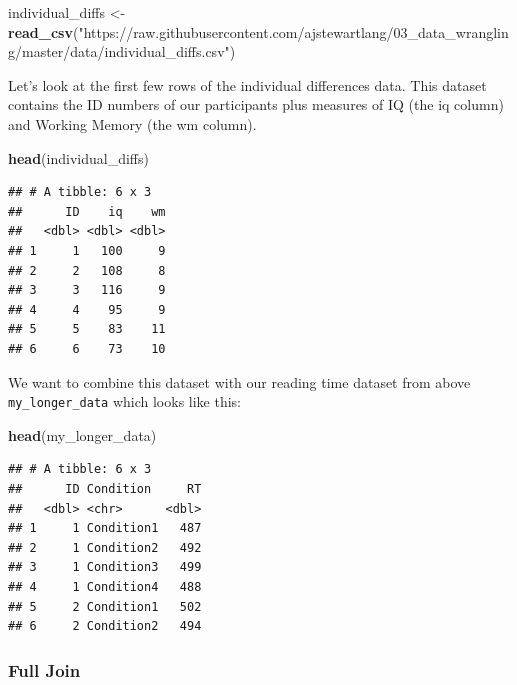 \documentclass[
]{book}
\newenvironment{Shaded}{\begin{snugshade}}{\end{snugshade}}
\newcommand{\FunctionTok}[1]{\textcolor[rgb]{0.13,0.29,0.53}{\textbf{#1}}}
\newcommand{\NormalTok}[1]{#1}
\newcommand{\OtherTok}[1]{\textcolor[rgb]{0.56,0.35,0.01}{#1}}
\newcommand{\StringTok}[1]{\textcolor[rgb]{0.31,0.60,0.02}{#1}}
\begin{document}
\begin{Shaded}
\begin{Highlighting}[]
\NormalTok{individual\_diffs }\OtherTok{\textless{}{-}} \FunctionTok{read\_csv}\NormalTok{(}\StringTok{"https://raw.githubusercontent.com/ajstewartlang/03\_data\_wrangling/master/data/individual\_diffs.csv"}\NormalTok{)}
\end{Highlighting}
\end{Shaded}

Let's look at the first few rows of the individual differences data. This dataset contains the ID numbers of our participants plus measures of IQ (the iq column) and Working Memory (the wm column).

\begin{Shaded}
\begin{Highlighting}[]
\FunctionTok{head}\NormalTok{(individual\_diffs)}
\end{Highlighting}
\end{Shaded}

\begin{verbatim}
## # A tibble: 6 x 3
##      ID    iq    wm
##   <dbl> <dbl> <dbl>
## 1     1   100     9
## 2     2   108     8
## 3     3   116     9
## 4     4    95     9
## 5     5    83    11
## 6     6    73    10
\end{verbatim}

We want to combine this dataset with our reading time dataset from above \texttt{my\_longer\_data} which looks like this:

\begin{Shaded}
\begin{Highlighting}[]
\FunctionTok{head}\NormalTok{(my\_longer\_data)}
\end{Highlighting}
\end{Shaded}

\begin{verbatim}
## # A tibble: 6 x 3
##      ID Condition     RT
##   <dbl> <chr>      <dbl>
## 1     1 Condition1   487
## 2     1 Condition2   492
## 3     1 Condition3   499
## 4     1 Condition4   488
## 5     2 Condition1   502
## 6     2 Condition2   494
\end{verbatim}

\hypertarget{full-join}{%
\subsubsection*{Full Join}\label{full-join}}
\end{document}
